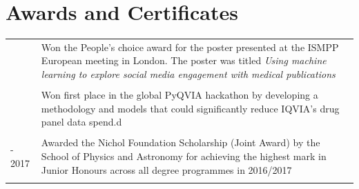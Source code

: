 \documentclass[a4paper,11pt]{article}
\begin{document}
\section{Awards and Certificates}
\begin{tabular}{>{\raggedleft\arraybackslash}p{2cm}|p{12.9cm}}
2024 & Won the People's choice award for the poster presented at the ISMPP European meeting in London. The poster was titled \textit{Using machine learning to explore social media engagement with medical publications} \\\multicolumn{2}{c}{}\\
2023 & Won first place in the global PyQVIA hackathon by developing a methodology and models that could significantly reduce IQVIA's drug panel data spend.d\\\multicolumn{2}{c}{}\\
2016 - 2017 & Awarded the Nichol Foundation Scholarship (Joint Award) by the School of Physics and Astronomy for achieving the highest mark in Junior Honours across all degree programmes in 2016/2017\\ \multicolumn{2}{c}{}\\
\end{tabular}
\end{document}
